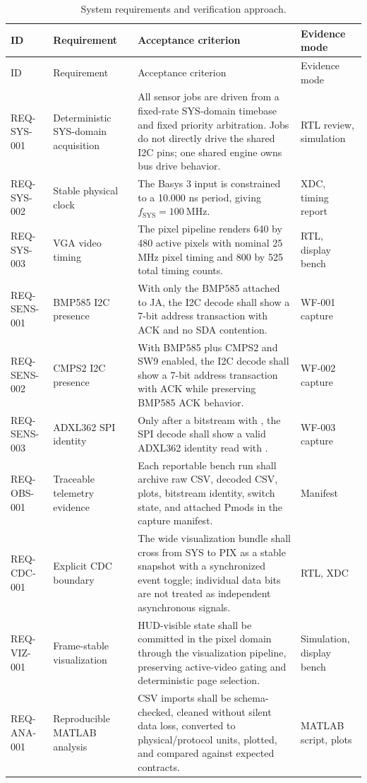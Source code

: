 \documentclass[11pt]{article}
\newcommand{\sig}[1]{\texttt{\detokenize{#1}}}
\newcommand{\param}[1]{\texttt{\detokenize{#1}}}
\begin{document}
\begin{longtable}{@{}p{}p{}p{}p{}@{}}
\caption{System requirements and verification approach.}
\label{tab:reqs}\\
\toprule
ID & Requirement & Acceptance criterion & Evidence mode \\
\midrule
\endfirsthead
\toprule
ID & Requirement & Acceptance criterion & Evidence mode \\
\midrule
\endhead
REQ-SYS-001 & Deterministic SYS-domain acquisition &
All sensor jobs are driven from a fixed-rate SYS-domain timebase and fixed
priority arbitration.  Jobs do not directly drive the shared I2C pins; one
shared engine owns bus drive behavior. & RTL review, simulation \\
REQ-SYS-002 & Stable physical clock &
The Basys 3 \sig{clk} input is constrained to a 10.000 ns period, giving
$f_{\mathrm{SYS}}=100~\mathrm{MHz}$. & XDC, timing report \\
REQ-SYS-003 & VGA video timing &
The pixel pipeline renders 640 by 480 active pixels with nominal 25 MHz pixel
timing and 800 by 525 total timing counts. & RTL, display bench \\
REQ-SENS-001 & BMP585 I2C presence &
With only the BMP585 attached to JA, the I2C decode shall show a 7-bit address
\sig{0x47} transaction with ACK and no SDA contention. & WF-001 capture \\
REQ-SENS-002 & CMPS2 I2C presence &
With BMP585 plus CMPS2 and SW9 enabled, the I2C decode shall show a 7-bit
address \sig{0x30} transaction with ACK while preserving BMP585 ACK behavior. &
WF-002 capture \\
REQ-SENS-003 & ADXL362 SPI identity &
Only after a bitstream with \param{USE_ADXL362_SPI_ACC=1}, the SPI decode shall
show a valid ADXL362 identity read with \sig{PARTID=0xF2}. & WF-003 capture \\
REQ-OBS-001 & Traceable telemetry evidence &
Each reportable bench run shall archive raw CSV, decoded CSV, plots, bitstream
identity, switch state, and attached Pmods in the capture manifest. & Manifest \\
REQ-CDC-001 & Explicit CDC boundary &
The wide visualization bundle shall cross from SYS to PIX as a stable snapshot
with a synchronized event toggle; individual data bits are not treated as
independent asynchronous signals. & RTL, XDC \\
REQ-VIZ-001 & Frame-stable visualization &
HUD-visible state shall be committed in the pixel domain through the
visualization pipeline, preserving active-video gating and deterministic page
selection. & Simulation, display bench \\
REQ-ANA-001 & Reproducible MATLAB analysis &
CSV imports shall be schema-checked, cleaned without silent data loss, converted
to physical/protocol units, plotted, and compared against expected contracts. &
MATLAB script, plots \\
\bottomrule
\end{longtable}
\end{document}
